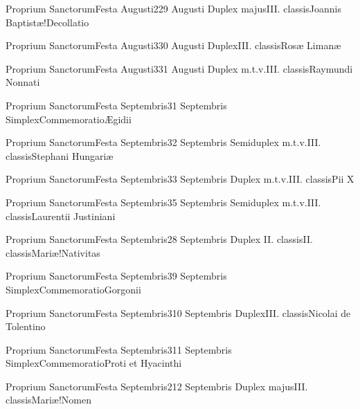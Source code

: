 \documentclass[psalterium-feriale.tex]{subfiles}
\begin{document}
	{Proprium Sanctorum}{Festa Augusti}{2}{29 Augusti}
	{Duplex majus}{III. classis}{Joannis Baptistæ!Decollatio}
	{\psalmodiapropria}
	{\UMEXcRubric}

	{Proprium Sanctorum}{Festa Augusti}{3}{30 Augusti}
	{Duplex}{III. classis}{Rosæ Limanæ}
	{}
	{}
\MUVNbRubric

	{Proprium Sanctorum}{Festa Augusti}{3}{31 Augusti}
	{Duplex m.t.v.}{III. classis}{Raymundi Nonnati}
	{}
	{}
\COPObRubric

	{Proprium Sanctorum}{Festa Septembris}{3}{1 Septembris}
	{Simplex}{Commemoratio}{Ægidii}
	{}
	{}
\COPOaRubric

	{Proprium Sanctorum}{Festa Septembris}{3}{2 Septembris}
	{Semiduplex m.t.v.}{III. classis}{Stephani Hungariæ}
	{}
	{}
\COPOaRubric

	{Proprium Sanctorum}{Festa Septembris}{3}{3 Septembris}
	{Duplex m.t.v.}{III. classis}{Pii X}
	{}
	{}
\COPObRubric

	{Proprium Sanctorum}{Festa Septembris}{3}{5 Septembris}
	{Semiduplex m.t.v.}{III. classis}{Laurentii Justiniani}
	{}
	{}
\COPOaRubric

	{Proprium Sanctorum}{Festa Septembris}{2}{8 Septembris}
	{Duplex II. classis}{II. classis}{Mariæ!Nativitas}
	{}
	{}
\psalmodiapropria

	{Proprium Sanctorum}{Festa Septembris}{3}{9 Septembris}
	{Simplex}{Commemoratio}{Gorgonii}
	{}
	{}
\UMEXaRubric

	{Proprium Sanctorum}{Festa Septembris}{3}{10 Septembris}
	{Duplex}{III. classis}{Nicolai de Tolentino}
	{}
	{}
\COPObRubric

	{Proprium Sanctorum}{Festa Septembris}{3}{11 Septembris}
	{Simplex}{Commemoratio}{Proti et Hyacinthi}
	{}
	{}
\PMEXaRubric

	{Proprium Sanctorum}{Festa Septembris}{2}{12 Septembris}
	{Duplex majus}{III. classis}{Mariæ!Nomen}
	{\psalmodiapropria}
	{\CBMVRubric}
\end{document}
